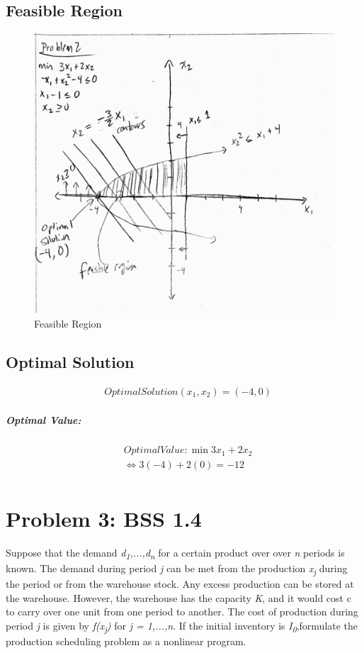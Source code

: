 \documentclass[12pt]{article}
\begin{document}
\subsection {Feasible Region}
    \begin{figure}[H]
        \centering
        \includegraphics[width=\textwidth]{Feasible_Region.png}
        \caption{Feasible Region}
    \end{figure}

\subsection{Optimal Solution}
    \begin{align*}
        &Optimal Solution (x_1 , x_2) = (-4,0)
    \end{align*}

\subparagraph{Optimal Value:}
    \begin{align*}
        &Optimal Value: \min 3x_1 + 2x_2\\
        &\Longleftrightarrow 3(-4)+2(0) = -12\\
    \end{align*}


\section{Problem 3: BSS 1.4}
Suppose that the demand \textit{d\textsubscript{1},...,d\textsubscript{n}} for a certain product over over \textit{n} periods is known. The demand during period \textit{j} can be met from the production \textit{x\textsubscript{j}} during the period or from the warehouse stock. Any excess production can be stored at the warehouse. However, the warehouse has the capacity \textit{K}, and it would cost \textdollar c to carry over one unit from one period to another. The cost of production during period \textit{j} is given by \textit{f(x\textsubscript{j})} for \textit{j = 1,...,n}. If the initial inventory is \textit{I\textsubscript{0}},formulate the production scheduling problem as a nonlinear program. 
\end{document}
